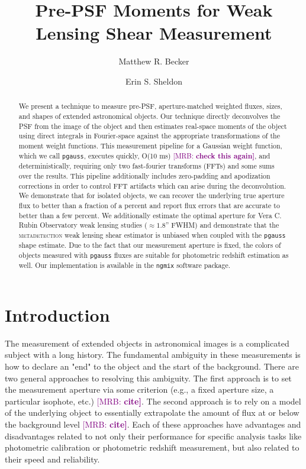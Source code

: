 \documentclass[twocolappendix, appendixfloats, numberedappendix, twocolumn, apj]{openjournal}
\newcommand{\mrb}[1]{\textcolor{purple}{[MRB: \bf #1]}\xspace}
\newcommand{\mdet}{\textsc{metadetection}\xspace}
\newcommand{\pgauss}{\texttt{pgauss}\xspace}
\begin{document}
\title{Pre-PSF Moments for Weak Lensing Shear Measurement}

\author{Matthew R. Becker}
\author{Erin S. Sheldon}

\begin{abstract}
  We present a technique to measure pre-PSF, aperture-matched weighted fluxes, sizes,
  and shapes of extended astronomical objects. Our technique directly deconvolves the
  PSF from the image of the object and then estimates real-space moments of the object
  using direct integrals in Fourier-space against the appropriate transformations of the
  moment weight functions. This measurement pipeline for a Gaussian weight function,
  which we call \pgauss, executes quickly, O(10 ms) \mrb{check this again}, and
  deterministically, requiring only two fast-fourier transforms (FFTs) and some sums
  over the results. This pipeline additionally includes zero-padding and apodization
  corrections in order to control FFT artifacts which can arise during the
  deconvolution. We demonstrate that for isolated objects, we can recover the underlying
  true aperture flux to better than a fraction of a percent and report flux errors that
  are accurate to better than a few percent. We additionally estimate the optimal
  aperture for Vera C. Rubin Observatory weak lensing studies ($\approx1.8$'' FWHM) and
  demonstrate that the \mdet weak lensing shear estimator is unbiased when coupled with
  the \pgauss shape estimate. Due to the fact that our measurement aperture is fixed,
  the colors of objects measured with \pgauss fluxes are suitable for photometric
  redshift estimation as well. Our implementation is available in the \texttt{ngmix}
  software package.
\end{abstract}

\section{Introduction}\label{sec:intro}

The measurement of extended objects in astronomical images is a complicated subject with a long
history. The fundamental ambiguity in these measurements is how to declare an "end" to the object
and the start of the background. There are two general approaches to resolving this ambiguity. The
first approach is to set the measurement aperture via some criterion (e.g., a fixed aperture size,
a particular isophote, etc.) \mrb{cite}. The second approach is to rely on a model of the underlying object to
essentially extrapolate the amount of flux at or below the background level \mrb{cite}. Each of these approaches
have advantages and disadvantages related to not only their performance for specific analysis tasks
like photometric calibration or photometric redshift measurement, but also related to their speed and
reliability.
\end{document}

